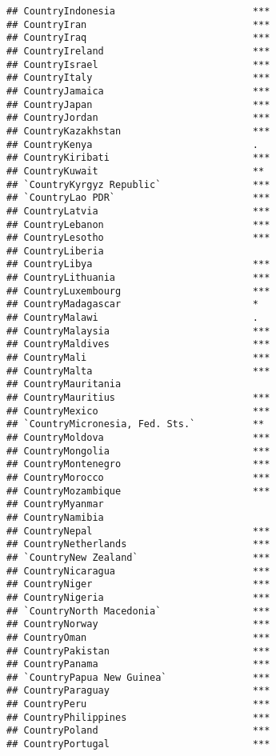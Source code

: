 \documentclass[
]{article}
\begin{document}
\begin{verbatim}
## CountryIndonesia                        ***
## CountryIran                             ***
## CountryIraq                             ***
## CountryIreland                          ***
## CountryIsrael                           ***
## CountryItaly                            ***
## CountryJamaica                          ***
## CountryJapan                            ***
## CountryJordan                           ***
## CountryKazakhstan                       ***
## CountryKenya                            .  
## CountryKiribati                         ***
## CountryKuwait                           ** 
## `CountryKyrgyz Republic`                ***
## `CountryLao PDR`                        ***
## CountryLatvia                           ***
## CountryLebanon                          ***
## CountryLesotho                          ***
## CountryLiberia                             
## CountryLibya                            ***
## CountryLithuania                        ***
## CountryLuxembourg                       ***
## CountryMadagascar                       *  
## CountryMalawi                           .  
## CountryMalaysia                         ***
## CountryMaldives                         ***
## CountryMali                             ***
## CountryMalta                            ***
## CountryMauritania                          
## CountryMauritius                        ***
## CountryMexico                           ***
## `CountryMicronesia, Fed. Sts.`          ** 
## CountryMoldova                          ***
## CountryMongolia                         ***
## CountryMontenegro                       ***
## CountryMorocco                          ***
## CountryMozambique                       ***
## CountryMyanmar                             
## CountryNamibia                             
## CountryNepal                            ***
## CountryNetherlands                      ***
## `CountryNew Zealand`                    ***
## CountryNicaragua                        ***
## CountryNiger                            ***
## CountryNigeria                          ***
## `CountryNorth Macedonia`                ***
## CountryNorway                           ***
## CountryOman                             ***
## CountryPakistan                         ***
## CountryPanama                           ***
## `CountryPapua New Guinea`               ***
## CountryParaguay                         ***
## CountryPeru                             ***
## CountryPhilippines                      ***
## CountryPoland                           ***
## CountryPortugal                         ***

\end{verbatim}
\end{document}
